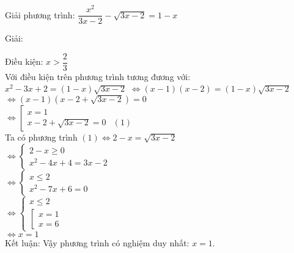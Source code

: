 \begin{vd}
  Giải phương trình: $ \dfrac{x^2}{3x-2} - \sqrt{3x-2} = 1-x $
\end{vd}
\begin{center}
    Giải:
\end{center}

Điều kiện: $ x > \dfrac{2}{3} $ \\
Với điều kiện trên phương trình tương đương với: \\
$ x^2 -3x +2 = (1-x)\sqrt{3x-2} $
$ \Leftrightarrow 
 (x-1)(x-2) = (1-x)\sqrt{3x-2}
$ \\
$ \Leftrightarrow 
    (x-1)(x-2 + \sqrt{3x-2}) =0
$ \\
$ \Leftrightarrow 
    \left[ 
        \begin{array}{lc} 
            x=1 \\
            x-2 + \sqrt{3x-2} =0 &(1)
        \end{array} 
    \right.
$ \\
Ta có phương trình $(1) \Leftrightarrow 
    2-x =\sqrt{3x-2}
$\\
$ \Leftrightarrow 
\begin{cases}
  	2 - x \geq 0 \\
    x^2 -4x +4 =3x -2
\end{cases} 
$ \\
$ \Leftrightarrow 
\begin{cases}
  	x \leq 2 \\
    x^2 -7x +6 =0
\end{cases}
$ \\
$ \Leftrightarrow 
\begin{cases}
  	x \leq 2 \\
    \left[
        \begin{array}{l}
            x=1 \\
            x=6
        \end{array}
    \right. 
    
\end{cases}
$ \\
$ \Leftrightarrow 
x=1 $ \\
Kết luận: Vậy phương trình có nghiệm duy nhất: $ x=1 $.
